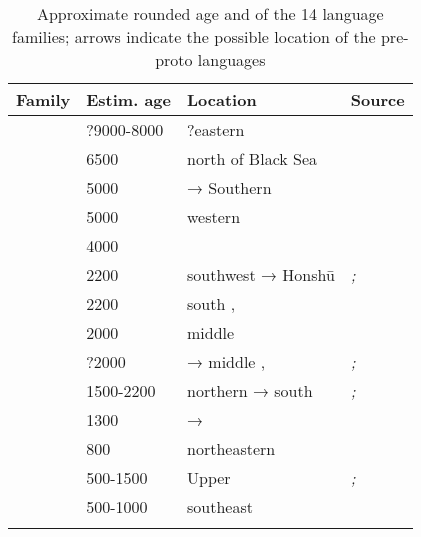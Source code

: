 \begin{table}[t!]
\caption{Approximate rounded age and   of the 14 language families; arrows indicate the possible location of the pre-proto languages}
\label{tab:2:1}

\begin{tabularx}{\textwidth}{llQQ}
\lsptoprule

\textbf{Family} & \textbf{Estim. age} & \textbf{Location} & \textbf{Source}\\
\midrule
{} & ?9000-8000 & ?eastern  & \citealt{BlenchPost2014}\\
\tablevspace
{} & 6500 & north of Black Sea & \citealt{AnthonyRinge2015}\\
\tablevspace
{} & 5000 &  → Southern  & \citealt{Fortescue2013}\\
\tablevspace
{} & 5000 & western  & \citealt{Janhunen2009}\\
\tablevspace
{} & 4000 &  & \citealt{Fortescue2005}\\
\tablevspace
{} & 2200 & southwest  → Honshū & \citealt{Janhunen2010}\emph{\textup{;}} \citealt{LeeHasegawa2011}\\
\tablevspace
{} & 2200 & south ,  & \citealt{Yunusbayev2015}\\
\tablevspace
{} & 2000 & middle  & \citealt{Pevnov2012}\\
\tablevspace
{} & ?2000 &  → middle ,  & \citealt{Häkkinen2012}\emph{\textup{;}} \citealt{Maslova2003a}\\
\tablevspace
{} & 1500-2200 & northern  → south  & \citealt{Vajda2004}\emph{\textup{;}} \citealt{VovinVajdadelaVaissière2016}\\
\tablevspace
{} & 1300 &  →  & \citealt{LeeHasegawa2013}\\
\tablevspace
{} & 800 & northeastern  & \citealt{Janhunen2003a}\\
\tablevspace
{} & 500-1500 & Upper  & \citealt{Fortescue2011}\emph{\textup{;}} \citealt{Janhunen2010}\\
\tablevspace
{} & 500-1000 & southeast  & \citealt{Janhunen2010}\\
\lspbottomrule
\end{tabularx}
\end{table}

